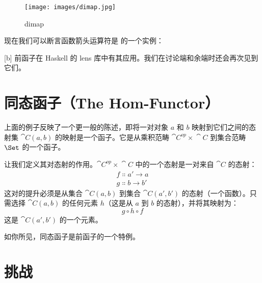 \begin{figure}[H]
  \centering
  \texttt{[image: images/dimap.jpg]}
  \caption{dimap}
\end{figure}

\noindent
现在我们可以断言函数箭头运算符是  的一个实例：

[b]
前函子在 Haskell 的 lens 库中有其应用。我们在讨论端和余端时还会再次见到它们。

\section{同态函子（The Hom-Functor）}

上面的例子反映了一个更一般的陈述，即将一对对象 $a$ 和 $b$ 映射到它们之间的态射集 $\cat{C}(a, b)$ 的映射是一个函子。它是从乘积范畴 $\cat{C}^\mathit{op}\times{}\cat{C}$ 到集合范畴 $\Set$ 的一个函子。

让我们定义其对态射的作用。$\cat{C}^\mathit{op}\times{}\cat{C}$ 中的一个态射是一对来自 $\cat{C}$ 的态射：
\begin{gather*}
  f \Colon a' \to a \\
  g \Colon b \to b'
\end{gather*}
这对的提升必须是从集合 $\cat{C}(a, b)$ 到集合 $\cat{C}(a', b')$ 的态射（一个函数）。只需选择 $\cat{C}(a, b)$ 的任何元素 $h$（这是从 $a$ 到 $b$ 的态射），并将其映射为：
\[g \circ h \circ f\]
这是 $\cat{C}(a', b')$ 的一个元素。

如你所见，同态函子是前函子的一个特例。

\section{挑战}

